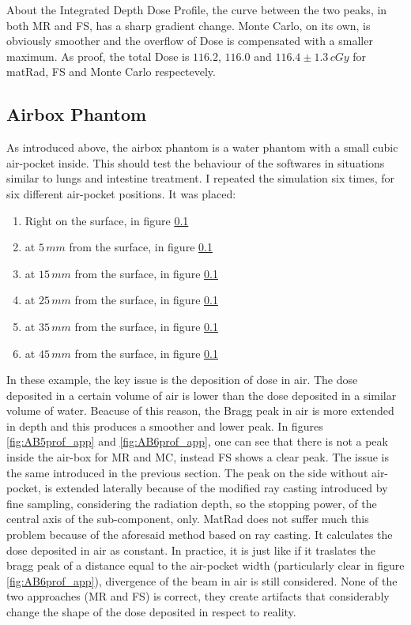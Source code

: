 \documentclass[12pt, a4paper, twoside]{book}
\begin{document}
About the Integrated Depth Dose Profile, the curve between the two peaks, in both MR and FS, has a sharp gradient change. Monte Carlo, on its own, is obviously smoother and the overflow of Dose is compensated with a smaller maximum. As proof, the total Dose is $116.2$, $116.0$ and $116.4\pm1.3\,cGy$ for matRad, FS and Monte Carlo respectevely.



\subsection{Airbox Phantom}
As introduced above, the airbox phantom is a water phantom with a small cubic air-pocket inside. This should test the behaviour of the softwares in situations similar to lungs and intestine treatment. 
I repeated the simulation six times, for six different air-pocket positions. It was placed:

\begin{enumerate}
\item Right on the surface, in figure \ref{}
\item at $5\,mm$ from the surface, in figure \ref{}
\item at $15\,mm$ from the surface, in figure \ref{}
\item at $25\,mm$ from the surface, in figure \ref{}
\item at $35\,mm$ from the surface, in figure \ref{}
\item at $45\,mm$ from the surface, in figure \ref{}
\end{enumerate}


In these example, the key issue is the deposition of dose in air. The dose deposited in a certain volume of air is lower than the dose deposited in a similar volume of water. Beacuse of this reason, the Bragg peak in air is more extended in depth and this produces a smoother and lower peak. In figures \ref{fig:AB5prof_app} and \ref{fig:AB6prof_app}, one can see that there is not a peak inside the air-box for MR and MC, instead FS shows a clear peak. The issue is the same introduced in the previous section. The peak on the side without air-pocket, is extended laterally because of the modified ray casting introduced by fine sampling, considering the radiation depth, so the stopping power, of the central axis of the sub-component, only.
MatRad does not suffer much this problem because of the aforesaid method based on ray casting. It calculates the dose deposited in air as constant. In practice, it is just like if it traslates the bragg peak of a distance equal to the air-pocket width (particularly clear in figure \ref{fig:AB6prof_app}), divergence of the beam in air is still considered.
None of the two approaches (MR and FS) is correct, they create artifacts that considerably change the shape of the dose deposited in respect to reality.
\end{document}
